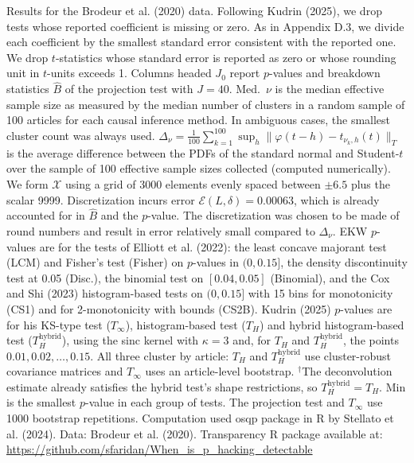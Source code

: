 \begin{table}[htbp]
\medskip
\begin{minipage}{\linewidth}
Results for the Brodeur et al. (2020) data. Following Kudrin (2025), we drop tests whose reported coefficient is missing or zero.
As in Appendix D.3, we divide each coefficient by the smallest standard error consistent with the reported one.
We drop $t$-statistics whose standard error is reported as zero or whose rounding unit in $t$-units exceeds 1.
Columns headed $J_0$ report $p$-values and breakdown statistics $\widehat{B}$ of the projection test with $J=40$.
Med.\ $\nu$ is the median effective sample size as measured by the median number of clusters in a random sample of 100 articles for each causal inference method.
In ambiguous cases, the smallest cluster count was always used.
$\Delta_\nu=\frac{1}{100}\sum_{k=1}^{100}\sup_h\|\varphi(t-h)-t_{\nu_k,h}(t)\|_T$ is the average difference between the PDFs of the standard normal and Student-$t$ over the sample of 100 effective sample sizes collected (computed numerically).
We form $\mathcal{X}$ using a grid of 3000 elements evenly spaced between $\pm 6.5$ plus the scalar 9999.
Discretization incurs error $\mathcal{E}(L,\delta)=0.00063$, which is already accounted for in $\widehat{B}$ and the $p$-value.
The discretization was chosen to be made of round numbers and result in error relatively small compared to $\Delta_\nu$.
EKW $p$-values are for the tests of Elliott et al. (2022): the least concave majorant test (LCM) and Fisher's test (Fisher) on $p$-values in $(0,0.15]$, the density discontinuity test at 0.05 (Disc.), the binomial test on $[0.04,0.05]$ (Binomial), and the Cox and Shi (2023) histogram-based tests on $(0,0.15]$ with 15 bins for monotonicity (CS1) and for 2-monotonicity with bounds (CS2B).
Kudrin (2025) $p$-values are for his KS-type test ($T_\infty$), histogram-based test ($T_H$) and hybrid histogram-based test ($T_H^{\mathrm{hybrid}}$), using the sinc kernel with $\kappa=3$ and, for $T_H$ and $T_H^{\mathrm{hybrid}}$, the points $0.01,0.02,\ldots,0.15$.
All three cluster by article: $T_H$ and $T_H^{\mathrm{hybrid}}$ use cluster-robust covariance matrices and $T_\infty$ uses an article-level bootstrap.
$^\dagger$The deconvolution estimate already satisfies the hybrid test's shape restrictions, so $T_H^{\mathrm{hybrid}}=T_H$.
Min is the smallest $p$-value in each group of tests.
The projection test and $T_\infty$ use 1000 bootstrap repetitions.
Computation used osqp package in R by Stellato et al. (2024). Data: Brodeur et al. (2020).
Transparency R package available at: \url{https://github.com/sfaridan/When_is_p_hacking_detectable}
\end{minipage}
\end{table}
